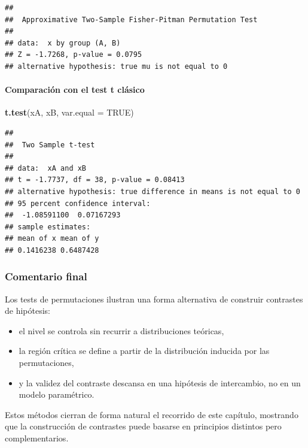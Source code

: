 \documentclass[
]{article}
\newenvironment{Shaded}{\begin{snugshade}}{\end{snugshade}}
\newcommand{\AttributeTok}[1]{\textcolor[rgb]{0.13,0.29,0.53}{#1}}
\newcommand{\ConstantTok}[1]{\textcolor[rgb]{0.56,0.35,0.01}{#1}}
\newcommand{\FunctionTok}[1]{\textcolor[rgb]{0.13,0.29,0.53}{\textbf{#1}}}
\newcommand{\NormalTok}[1]{#1}
\providecommand{\tightlist}{%
  \setlength{\itemsep}{0pt}\setlength{\parskip}{0pt}}
\begin{document}
\begin{verbatim}
## 
##  Approximative Two-Sample Fisher-Pitman Permutation Test
## 
## data:  x by group (A, B)
## Z = -1.7268, p-value = 0.0795
## alternative hypothesis: true mu is not equal to 0
\end{verbatim}

\paragraph{Comparación con el test t clásico}\label{comparaciuxf3n-con-el-test-t-cluxe1sico}

\begin{Shaded}
\begin{Highlighting}[]
\FunctionTok{t.test}\NormalTok{(xA, xB, }\AttributeTok{var.equal =} \ConstantTok{TRUE}\NormalTok{)}
\end{Highlighting}
\end{Shaded}

\begin{verbatim}
## 
##  Two Sample t-test
## 
## data:  xA and xB
## t = -1.7737, df = 38, p-value = 0.08413
## alternative hypothesis: true difference in means is not equal to 0
## 95 percent confidence interval:
##  -1.08591100  0.07167293
## sample estimates:
## mean of x mean of y 
## 0.1416238 0.6487428
\end{verbatim}

\subsubsection{Comentario final}\label{comentario-final}

Los tests de permutaciones ilustran una forma alternativa de construir contrastes de hipótesis:

\begin{itemize}
\tightlist
\item
  el nivel se controla sin recurrir a distribuciones teóricas,
\item
  la región crítica se define a partir de la distribución inducida por las permutaciones,
\item
  y la validez del contraste descansa en una hipótesis de intercambio, no en un modelo paramétrico.
\end{itemize}

Estos métodos cierran de forma natural el recorrido de este capítulo, mostrando que la construcción de contrastes puede basarse en principios distintos pero complementarios.
\end{document}
